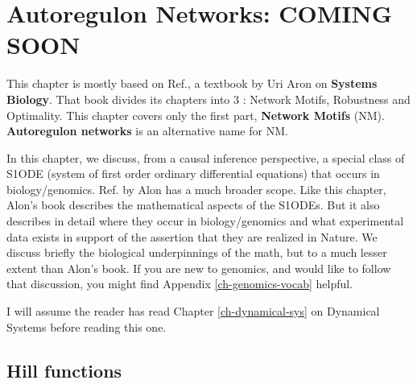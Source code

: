 \chapter{Autoregulon Networks: COMING SOON}
\label{ch-autoregulons}


This chapter is mostly based on Ref.\cite{alon-book},
a textbook by Uri Aron 
on {\bf Systems Biology}. That book divides its chapters into 3 : Network Motifs, Robustness and Optimality. This chapter covers only the first part, {\bf Network Motifs} (NM). {\bf Autoregulon networks}
is an alternative name for NM. 

In this chapter, we discuss,
from a causal inference perspective, a  special 
class of 
S1ODE (system of first order ordinary differential equations) that occurs in biology/genomics.
 Ref.\cite{alon-book} by Alon
 has a much broader scope. Like this chapter, 
Alon's book describes the mathematical aspects of the
 S1ODEs. But it 
also describes  in detail where they occur in biology/genomics and what experimental data exists in support
of the assertion that they are 
realized in Nature. We discuss briefly the biological
underpinnings of the math, but 
to a much lesser extent than Alon's book.
If you are new to genomics, and would like to follow that discussion, you might find Appendix \ref{ch-genomics-vocab} helpful.

I will assume
the reader has read 
 Chapter \ref{ch-dynamical-sys}
on Dynamical Systems before reading this one.



\section{Hill functions}

